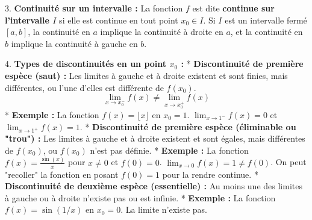 \documentclass[12pt,a4paper]{report}
\begin{document}
3.  \textbf{Continuité sur un intervalle :}
    La fonction $f$ est dite \textbf{continue sur l'intervalle $I$} si elle est continue en tout point $x_0 \in I$. Si $I$ est un intervalle fermé $[a, b]$, la continuité en $a$ implique la continuité à droite en $a$, et la continuité en $b$ implique la continuité à gauche en $b$.

4.  \textbf{Types de discontinuités en un point $x_0$ :}
    *   \textbf{Discontinuité de première espèce (saut) :} Les limites à gauche et à droite existent et sont finies, mais différentes, ou l'une d'elles est différente de $f(x_0)$.
        $$\lim_{x \to x_0^-} f(x) \neq \lim_{x \to x_0^+} f(x)$$
        *   \textbf{Exemple :} La fonction $f(x) = \lfloor x \rfloor$ en $x_0 = 1$. $\lim_{x \to 1^-} f(x) = 0$ et $\lim_{x \to 1^+} f(x) = 1$.
    *   \textbf{Discontinuité de première espèce (éliminable ou "trou") :} Les limites à gauche et à droite existent et sont égales, mais différentes de $f(x_0)$, ou $f(x_0)$ n'est pas définie.
        *   \textbf{Exemple :} La fonction $f(x) = \frac{\sin(x)}{x}$ pour $x \neq 0$ et $f(0) = 0$. $\lim_{x \to 0} f(x) = 1 \neq f(0)$. On peut "recoller" la fonction en posant $f(0)=1$ pour la rendre continue.
    *   \textbf{Discontinuité de deuxième espèce (essentielle) :} Au moins une des limites à gauche ou à droite n'existe pas ou est infinie.
        *   \textbf{Exemple :} La fonction $f(x) = \sin(1/x)$ en $x_0 = 0$. La limite n'existe pas.
\end{document}
